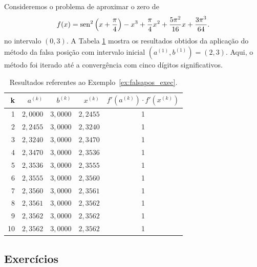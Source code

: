 \begin{ex}\label{ex:falsapos_exec}
  Consideremos o problema de aproximar o zero de
\begin{equation}
  f(x) = \operatorname{sen}^2\left(x+\frac{\pi}{4}\right) - x^3 + \frac{\pi}{4}x^2 + \frac{5\pi^2}{16}x + \frac{3\pi^3}{64}.
\end{equation}
no intervalo $(0, 3)$. A Tabela \ref{tab:falsapos_exec} mostra os resultados obtidos da aplicação do método da falsa posição com intervalo inicial $(a^{(1)}, b^{(1)}) = (2, 3)$. Aqui, o método foi iterado até a convergência com cinco dígitos significativos.

\begin{table}[h!]
  \centering
  \caption{Resultados referentes ao Exemplo~\ref{ex:falsapos_exec}.}
  \begin{tabular}{r|rr|r|c}
    k & $a^{(k)}$ & $b^{(k)}$ & $x^{(k)}$ & $f'(a^{(k)})\cdot f'(x^{(k)})$\\\hline
    1 & $2,0000$ & $3,0000$ & $2,2455$ & 1 \\
    2 & $2,2455$ & $3,0000$ & $2,3240$ &  1 \\
    3 & $2,3240$ & $3,0000$ & $2,3470$ & 1 \\
    4 & $2,3470$ & $3,0000$ & $2,3536$ & 1 \\
    5 & $2,3536$ & $3,0000$ & $2,3555$ & 1 \\
    6 & $2,3555$ & $3,0000$ & $2,3560$ & 1 \\
    7 & $2,3560$ & $3,0000$ & $2,3561$ &  1 \\
    8 & $2,3561$ & $3,0000$ & $2,3562$ & 1 \\
    9 & $2,3562$ & $3,0000$ & $2,3562$ & 1 \\
    10 & $2,3562$ & $3,0000$ & $2,3562$ & 1 \\\hline
  \end{tabular}
  \label{tab:falsapos_exec}
\end{table}

% 
\end{ex}

\subsection*{Exercícios}

